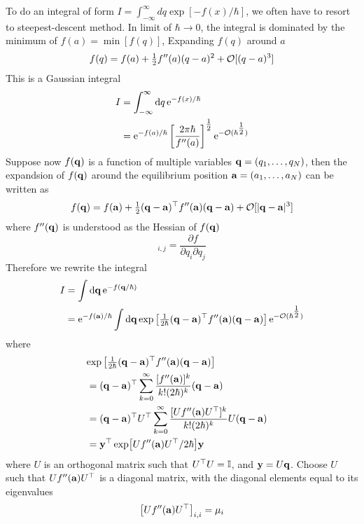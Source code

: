 \documentclass[10pt]{article}
\begin{document}
	To do an integral of form $I = \int_{-\infty}^{\infty} dq \exp[-f(x)/\hbar]$, we often have to resort to steepest-descent method. In limit of $\hbar \to 0$, the integral is dominated by the minimum of $f(a) = \min[f(q)]$, Expanding $f(q)$ around $a$
	\begin{equation}
		f(q) = f(a)	+ \tfrac{1}{2} f''(a) (q-a)^2 + {\mathcal{O}}[(q-a)^3]
	\end{equation}
	This is a Gaussian integral
	\begin{align*}
		I &= \int_{-\infty}^{\infty} \mathop{}\!\mathrm{d} q \, {\mathrm{e}}^{-f(x)/\hbar} \\
		&= {\mathrm{e}}^{-f(a)/\hbar} \left[\frac{2\pi \hbar}{f''(a)}\right]^{\tfrac{1}{2}} {\mathrm{e}}^{-{\mathcal{O}}(\hbar^{\tfrac{1}{2}})}
	\end{align*}
	Suppose now $f({\bf q})$ is a function of multiple variables ${\bf q} = (q_1, \dots, q_N)$, then the expandsion of $f({\bf q})$ around the equilibrium position ${\bf a} = (a_1, \dots, a_N)$ can be written as
	\begin{equation}
		f({\bf q}) = f({\bf a}) + \tfrac{1}{2} ({\bf q} - {\bf a})^\top f''({\bf a}) ({\bf q} - {\bf a}) + {\mathcal{O}}[|{\bf q} - {\bf a}|^3]
	\end{equation}
	where $f''({\bf q})$ is understood as the Hessian of $f({\bf q})$
	\begin{equation}
		[f''(\bfq)]_{i,j} = \frac{\partial f}{\partial q_i \partial q_j}
	\end{equation}
	Therefore we rewrite the integral
	\begin{align*}
		I &= \int \mathop{}\!\mathrm{d} {\bf q} \, {\mathrm{e}}^{-f({\bf q}/\hbar)}\\
		&= {\mathrm{e}}^{-f({\bf a})/\hbar} \int \mathop{}\!\mathrm{d} {\bf q} \exp\left[ \tfrac{1}{2\hbar} ({\bf q} - {\bf a})^\top f''({\bf a}) ({\bf q} - {\bf a}) \right] {\mathrm{e}}^{-{\mathcal{O}}(\hbar^{\tfrac{1}{2}})}
	\end{align*}
	where
	\begin{align*}
		\lefteqn{\exp \left[ \tfrac{1}{2\hbar} (\bfq - \bfa)^\top f''(\bfa) (\bfq - \bfa) \right]} \\
		&= (\bfq - \bfa)^\top \sum_{k=0}^{\infty} \frac{[f''(\bfa)]^k}{k! (2\hbar)^k} (\bfq - \bfa)\\
		&= (\bfq - \bfa)^\top U^\top \sum_{k=0}^{\infty} \frac{[U f''(\bfa) U^\top]^k}{k! (2\hbar)^k} U(\bfq - \bfa)\\
		&= \bfy^\top \exp [U f''(\bfa) U^\top/2\hbar] \bfy
	\end{align*}
	where $U$ is an orthogonal matrix such that $U^\top U = {\mathbb{I}}$, and ${\bf y} = U {\bf q}$. Choose $U$ such that $Uf''({\bf a})U^\top$ is a diagonal matrix, with the diagonal elements equal to its eigenvalues
	\begin{equation}
		\left[Uf''({\bf a})U^\top\right]_{i,i} = \mu_i
	\end{equation}
\end{document}
